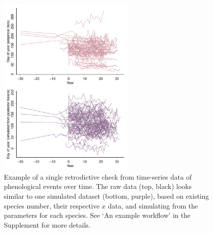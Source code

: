 \documentclass[11pt]{article}
\begin{document}
\begin{figure}[ht]
\centering
\noindent \includegraphics[width=0.6\textwidth]{..//examples/synchrony/graphs/rawvsonepredictivecheck.pdf}
\caption{Example of a single retrodictive check from time-series data of phenological events over time. The raw data (top, black) looks similar to one simulated dataset (bottom, purple), based on existing species number, their respective $x$ data, and simulating from the parameters for each species. See `An example workflow' in the Supplement for more details.}
\label{fig:retrodictivecheck}
\end{figure}
\end{document}
